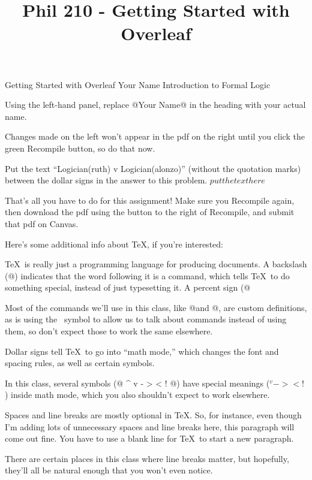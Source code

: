 
\title{Phil 210 - Getting Started with Overleaf}

\heading
Getting Started with Overleaf
Your Name
Introduction to Formal Logic
\endheading

\problems
{}
Using the left-hand panel, replace @Your Name@ in the heading with your actual name.

Changes made on the left won't appear in the pdf on the right until you click the green Recompile button, so do that now.

Put the text ``Logician(ruth) v Logician(alonzo)'' (without the quotation marks) between the dollar signs in the answer to this problem.
        \answer
        $ put the text here $
        \endanswer

That's all you have to do for this assignment! Make sure you Recompile again, then download the pdf using the button to the right of Recompile, and submit that pdf on Canvas.

\endproblems


Here's some additional info about \TeX, if you're interested:

\parskip\baselineskip \parindent\problemindent

\TeX\ is really just a programming language for producing documents. A backslash (@\@) indicates that the word following it is a command, which tells \TeX\ to do something special, instead of just typesetting it. A percent sign (@%

Most of the commands we'll use in this class, like @\heading@ and @\endanswer@, are custom definitions, as is using the \at\ symbol to allow us to talk about commands instead of using them, so don't expect those to work the same elsewhere.

Dollar signs tell \TeX\ to go into ``math mode,'' which changes the font and spacing rules, as well as certain symbols.

In this class, several symbols (@ ^ v - > < ! @) have special meanings ($ ^ v - > < ! $) inside math mode, which you also shouldn't expect to work elsewhere.

Spaces and line breaks are mostly optional in \TeX. So, for instance,
even though
I'm adding   lots   of unnecessary spaces  and line
breaks
here, this paragraph   will come out  fine. You have    to use a blank line for \TeX\ to start a new paragraph.

There are certain places in this class where line breaks matter, but hopefully, they'll all be natural enough that you won't even notice.
\bye
